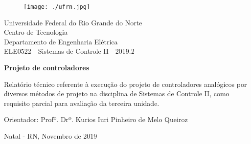 \begin{titlepage}
	\begin{center}
	
	\begin{figure}[!ht]
	\centering
	\texttt{[image: ./ufrn.jpg]}
	\end{figure}

		Universidade Federal do Rio Grande do Norte \\ Centro de Tecnologia \\ Departamento de Engenharia Elétrica \\ ELE0522 - Sistemas de Controle II - 2019.2 \\
\vspace{15pt}
        
        \vspace{85pt}
        
		\textbf{\Large{Projeto de controladores}}\\
			
	\end{center}
\vspace{1,5cm}
	
	\begin{flushright}

   \begin{list}{}{
      \setlength{\leftmargin}{4.5cm}
      \setlength{\rightmargin}{0cm}
      \setlength{\labelwidth}{0pt}
      \setlength{\labelsep}{\leftmargin}}

      \item Relatório técnico referente à execução do projeto de controladores analógicos por diversos métodos de projeto na disciplina de Sistemas de Controle II, como requisito parcial para avaliação da terceira unidade.

      \begin{list}{}{
      \setlength{\leftmargin}{0cm}
      \setlength{\rightmargin}{0cm}
      \setlength{\labelwidth}{0pt}
      \setlength{\labelsep}{\leftmargin}}


            \item Orientador: Profº. Drº. Kurios Iuri Pinheiro de Melo Queiroz 

      \end{list}
   \end{list}
\end{flushright}
\vspace{1cm}
\begin{center}
		\vspace{\fill}
		 Natal - RN, Novembro de 2019
			\end{center}
\end{titlepage}
\newpage